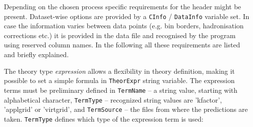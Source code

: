 Depending on the chosen process specific requirements for the header might be present. 
Dataset-wise options are provided by a {\tt CInfo} / {\tt DataInfo} variable set. In case the information
varies between data points (e.g. bin borders, hadronisation corrections etc.) it is
provided in the data file and recognised by the program using reserved column names.
In the following all these requirements are listed and briefly explained.

The theory type {\it expression} allows a flexibility in theory definition, making
it possible to set a simple formula in {\tt TheorExpr} string variable.  The
expression terms must be preliminary defined in {\tt TermName} -- a string value, 
starting with alphabetical character, {\tt TermType} -- recognized string values are 'kfactor',                                                                                        
'applgrid' or 'virtgrid', and {\tt TermSource} -- the files from where the
predictions are taken. {\tt TermType} defines which type of the expression term
is used:
